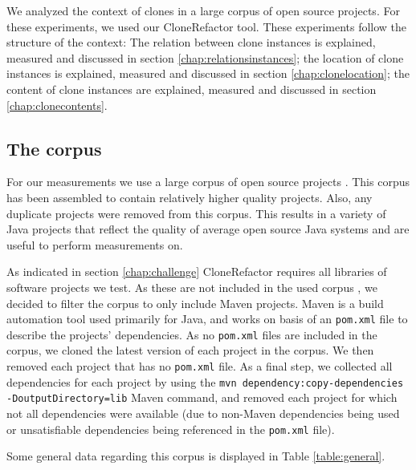 \documentclass[a4paper]{article}
\begin{document}
We analyzed the context of clones in a large corpus of open source projects. For these experiments, we used our CloneRefactor tool. These experiments follow the structure of the context: The relation between clone instances is explained, measured and discussed in section \ref{chap:relationsinstances}; the location of clone instances is explained, measured and discussed in section \ref{chap:clonelocation};  the content of clone instances are explained, measured and discussed in section \ref{chap:clonecontents}.

\subsection{The corpus}\label{chap:corpus}
For our measurements we use a large corpus of open source projects \cite{githubCorpus2013}. This corpus has been assembled to contain relatively higher quality projects. Also, any duplicate projects were removed from this corpus. This results in a variety of Java projects that reflect the quality of average open source Java systems and are useful to perform measurements on.

As indicated in section \ref{chap:challenge} CloneRefactor requires all libraries of software projects we test. As these are not included in the used corpus \cite{githubCorpus2013}, we decided to filter the corpus to only include Maven projects. Maven is a build automation tool used primarily for Java, and works on basis of an \texttt{pom.xml} file to describe the projects' dependencies. As no \texttt{pom.xml} files are included in the corpus, we cloned the latest version of each project in the corpus. We then removed each project that has no \texttt{pom.xml} file. As a final step, we collected all dependencies for each project by using the \texttt{mvn dependency:copy-dependencies -DoutputDirectory=lib} Maven command, and removed each project for which not all dependencies were available (due to non-Maven dependencies being used or unsatisfiable dependencies being referenced in the \texttt{pom.xml} file).

Some general data regarding this corpus is displayed in Table \ref{table:general}.
\end{document}
